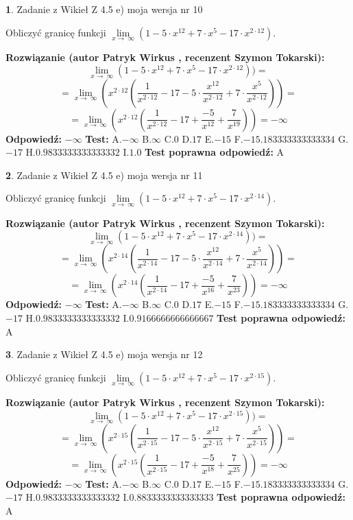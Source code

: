 \documentclass[12pt, a4paper]{article}
\theoremstyle{definition} %
\newtheorem{zad}{}
\newcommand{\zadStart}[1]{\begin{zad}#1\newline}
\newcommand{\zadStop}{\end{zad}}
\newcommand{\rozwStart}[2]{\noindent \textbf{Rozwiązanie (autor #1 , recenzent #2): }\newline}
\newcommand{\rozwStop}{\newline}
\newcommand{\odpStart}{\noindent \textbf{Odpowiedź:}\newline}
\newcommand{\odpStop}{\newline}
\newcommand{\testStart}{\noindent \textbf{Test:}\newline}
\newcommand{\testStop}{\newline}
\newcommand{\kluczStart}{\noindent \textbf{Test poprawna odpowiedź:}\newline}
\newcommand{\kluczStop}{\newline}
\begin{document}
\zadStart{Zadanie z Wikieł Z 4.5 e) moja wersja nr 10}


Obliczyć granicę funkcji  $\lim\limits_{x\to\ \infty}(1 - 5 \cdot x^{12}+7 \cdot x^{5}- 17 \cdot x^{2\cdot12})$.
\zadStop
\rozwStart{Patryk Wirkus}{Szymon Tokarski}
$$\lim\limits_{x\to\ \infty}(1 - 5 \cdot x^{12}+7 \cdot x^{5}- 17 \cdot x^{2\cdot12}))=$$
$$=\lim\limits_{x\to\ \infty}(x^{2\cdot12}(\frac{1}{x^{2\cdot12}}-17 -5 \cdot \frac{x^{12}}{x^{2\cdot12}}+7 \cdot \frac{x^{5}}{x^{2\cdot12}}))=$$
$$=\lim\limits_{x\to\ \infty}(x^{2\cdot12}(\frac{1}{x^{2\cdot12}}-17 + \frac{-5}{x^{12}}+ \frac{7}{x^{19}}))=-\infty$$
\rozwStop
\odpStart
$-\infty$
\odpStop
\testStart
A.$-\infty$ B.$\infty$ C.$0$ D.$17$ E.$-15$
F.$-15.183333333333334$ G.$-17$
H.$0.9833333333333332$
I.$1.0$
\testStop
\kluczStart
A
\kluczStop



\zadStart{Zadanie z Wikieł Z 4.5 e) moja wersja nr 11}


Obliczyć granicę funkcji  $\lim\limits_{x\to\ \infty}(1 - 5 \cdot x^{12}+7 \cdot x^{5}- 17 \cdot x^{2\cdot14})$.
\zadStop
\rozwStart{Patryk Wirkus}{Szymon Tokarski}
$$\lim\limits_{x\to\ \infty}(1 - 5 \cdot x^{12}+7 \cdot x^{5}- 17 \cdot x^{2\cdot14}))=$$
$$=\lim\limits_{x\to\ \infty}(x^{2\cdot14}(\frac{1}{x^{2\cdot14}}-17 -5 \cdot \frac{x^{12}}{x^{2\cdot14}}+7 \cdot \frac{x^{5}}{x^{2\cdot14}}))=$$
$$=\lim\limits_{x\to\ \infty}(x^{2\cdot14}(\frac{1}{x^{2\cdot14}}-17 + \frac{-5}{x^{16}}+ \frac{7}{x^{23}}))=-\infty$$
\rozwStop
\odpStart
$-\infty$
\odpStop
\testStart
A.$-\infty$ B.$\infty$ C.$0$ D.$17$ E.$-15$
F.$-15.183333333333334$ G.$-17$
H.$0.9833333333333332$
I.$0.9166666666666667$
\testStop
\kluczStart
A
\kluczStop



\zadStart{Zadanie z Wikieł Z 4.5 e) moja wersja nr 12}


Obliczyć granicę funkcji  $\lim\limits_{x\to\ \infty}(1 - 5 \cdot x^{12}+7 \cdot x^{5}- 17 \cdot x^{2\cdot15})$.
\zadStop
\rozwStart{Patryk Wirkus}{Szymon Tokarski}
$$\lim\limits_{x\to\ \infty}(1 - 5 \cdot x^{12}+7 \cdot x^{5}- 17 \cdot x^{2\cdot15}))=$$
$$=\lim\limits_{x\to\ \infty}(x^{2\cdot15}(\frac{1}{x^{2\cdot15}}-17 -5 \cdot \frac{x^{12}}{x^{2\cdot15}}+7 \cdot \frac{x^{5}}{x^{2\cdot15}}))=$$
$$=\lim\limits_{x\to\ \infty}(x^{2\cdot15}(\frac{1}{x^{2\cdot15}}-17 + \frac{-5}{x^{18}}+ \frac{7}{x^{25}}))=-\infty$$
\rozwStop
\odpStart
$-\infty$
\odpStop
\testStart
A.$-\infty$ B.$\infty$ C.$0$ D.$17$ E.$-15$
F.$-15.183333333333334$ G.$-17$
H.$0.9833333333333332$
I.$0.8833333333333333$
\testStop
\kluczStart
A
\kluczStop
\end{document}
